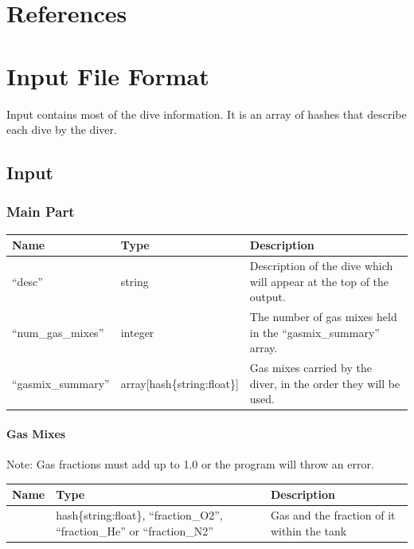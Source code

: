 \documentclass[12pt]{article}
\begin{document}
\newpage
\section{References}
\nocite{VPMforDummies}


\newpage

\appendix

\section{Input File Format}
Input contains most of the dive information. It is an array of hashes that describe each dive by the diver.

\subsection{Input}
\subsubsection{Main Part}
\begin{longtable}{|l|l|p{5cm}|}
\hline
 Name                 &  Type                         &  Description                                                          \\
\hline
 ``desc''             &  string                       &  Description of the dive which will appear at the top of the output.  \\
\hline
 ``num\_gas\_mixes''  &  integer                      &  The number of gas mixes held in the ``gasmix\_summary'' array.       \\
\hline
 ``gasmix\_summary''  &  array[hash\{string:float\}]  &  Gas mixes carried by the diver, in the order they will be used.      \\
\hline
\end{longtable}

\paragraph{Gas Mixes}
Note: Gas fractions must add up to 1.0 or the program will throw an error.
\begin{longtable}{|l|p{5cm}|p{5cm}|}
\hline
 Name                  &  Type                                                                                                &  Description  \\
\hline
   & hash\{string:float\}, ``fraction\_O2'', ``fraction\_He'' or ``fraction\_N2'' & Gas and the fraction of it within the tank  \\
\hline
\end{longtable}
\end{document}
